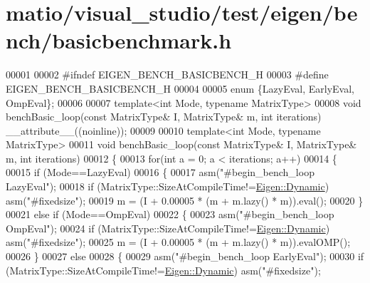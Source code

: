 \hypertarget{matio_2visual__studio_2test_2eigen_2bench_2basicbenchmark_8h_source}{}\section{matio/visual\+\_\+studio/test/eigen/bench/basicbenchmark.h}
\label{matio_2visual__studio_2test_2eigen_2bench_2basicbenchmark_8h_source}

\begin{DoxyCode}
00001 
00002 \textcolor{preprocessor}{#ifndef EIGEN\_BENCH\_BASICBENCH\_H}
00003 \textcolor{preprocessor}{#define EIGEN\_BENCH\_BASICBENCH\_H}
00004 
00005 \textcolor{keyword}{enum} \{LazyEval, EarlyEval, OmpEval\};
00006 
00007 \textcolor{keyword}{template}<\textcolor{keywordtype}{int} Mode, \textcolor{keyword}{typename} MatrixType>
00008 \textcolor{keywordtype}{void} benchBasic\_loop(\textcolor{keyword}{const} MatrixType& I, MatrixType& m, \textcolor{keywordtype}{int} iterations) \_\_attribute\_\_((noinline));
00009 
00010 \textcolor{keyword}{template}<\textcolor{keywordtype}{int} Mode, \textcolor{keyword}{typename} MatrixType>
00011 \textcolor{keywordtype}{void} benchBasic\_loop(\textcolor{keyword}{const} MatrixType& I, MatrixType& m, \textcolor{keywordtype}{int} iterations)
00012 \{
00013   \textcolor{keywordflow}{for}(\textcolor{keywordtype}{int} a = 0; a < iterations; a++)
00014   \{
00015     \textcolor{keywordflow}{if} (Mode==LazyEval)
00016     \{
00017       \textcolor{keyword}{asm}(\textcolor{stringliteral}{"#begin\_bench\_loop LazyEval"});
00018       \textcolor{keywordflow}{if} (MatrixType::SizeAtCompileTime!=\hyperlink{namespace_eigen_ad81fa7195215a0ce30017dfac309f0b2}{Eigen::Dynamic}) \textcolor{keyword}{asm}(\textcolor{stringliteral}{"#fixedsize"});
00019       m = (I + 0.00005 * (m + m.lazy() * m)).eval();
00020     \}
00021     \textcolor{keywordflow}{else} \textcolor{keywordflow}{if} (Mode==OmpEval)
00022     \{
00023       \textcolor{keyword}{asm}(\textcolor{stringliteral}{"#begin\_bench\_loop OmpEval"});
00024       \textcolor{keywordflow}{if} (MatrixType::SizeAtCompileTime!=\hyperlink{namespace_eigen_ad81fa7195215a0ce30017dfac309f0b2}{Eigen::Dynamic}) \textcolor{keyword}{asm}(\textcolor{stringliteral}{"#fixedsize"});
00025       m = (I + 0.00005 * (m + m.lazy() * m)).evalOMP();
00026     \}
00027     \textcolor{keywordflow}{else}
00028     \{
00029       \textcolor{keyword}{asm}(\textcolor{stringliteral}{"#begin\_bench\_loop EarlyEval"});
00030       \textcolor{keywordflow}{if} (MatrixType::SizeAtCompileTime!=\hyperlink{namespace_eigen_ad81fa7195215a0ce30017dfac309f0b2}{Eigen::Dynamic}) \textcolor{keyword}{asm}(\textcolor{stringliteral}{"#fixedsize"});

\end{DoxyCode}
